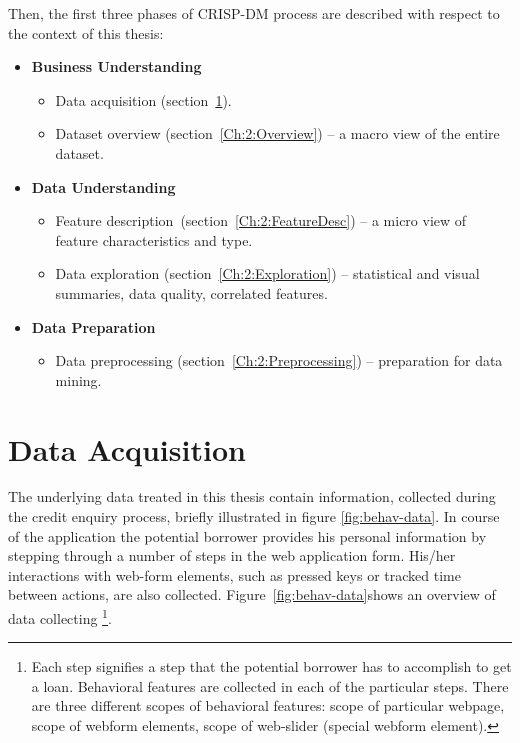 Then, the first three phases of CRISP-DM process are described with respect to the context of this thesis:
\begin{itemize}
    \item \textbf{Business Understanding }  
    \begin{itemize}
        \item Data acquisition (section~\ref{Ch:2:Acquisition}). 
        \item Dataset overview (section~\ref{Ch:2:Overview}) -- a macro view of the entire dataset.
    \end{itemize}
    \item \textbf{Data Understanding }
        \begin{itemize}
            \item Feature description~(section~\ref{Ch:2:FeatureDesc}) -- a micro view of feature characteristics and type.
            \item Data exploration (section~\ref{Ch:2:Exploration}) -- statistical and visual summaries, data quality, correlated features.
        \end{itemize}
    \item \textbf{Data Preparation }
            \begin{itemize}
                \item Data preprocessing (section~\ref{Ch:2:Preprocessing}) -- preparation for data mining.
        \end{itemize}
\end{itemize}

\section{Data Acquisition}\label{Ch:2:Acquisition}
The underlying data treated in this thesis contain information, collected during the credit enquiry process, briefly illustrated in figure \ref{fig:behav-data}. In course of the application the potential borrower provides his personal information by stepping through a number of steps in the web application form. His/her interactions with web-form elements, such as pressed keys or tracked time between actions, are also collected. Figure~\ref{fig:behav-data}shows an overview of data collecting \footnote{Each step signifies a step that the potential borrower has to accomplish to get a loan. Behavioral features are collected in each of the particular steps. There are three different scopes of behavioral features: scope of particular webpage, scope of webform elements, scope of web-slider (special webform element).}. 

